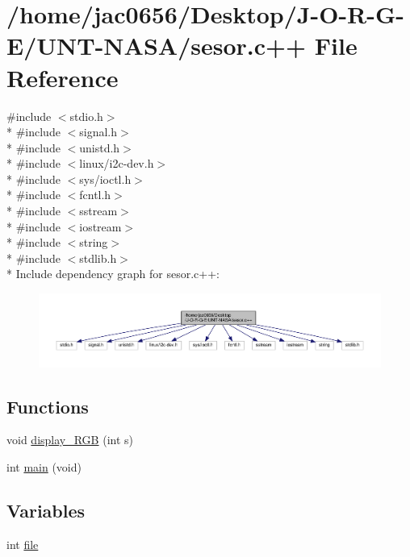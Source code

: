 \hypertarget{sesor_8c_09_09}{}\section{/home/jac0656/\+Desktop/\+J-\/\+O-\/\+R-\/\+G-\/\+E/\+U\+N\+T-\/\+N\+A\+S\+A/sesor.c++ File Reference}
\label{sesor_8c_09_09}
{\ttfamily \#include $<$stdio.\+h$>$}\\*
{\ttfamily \#include $<$signal.\+h$>$}\\*
{\ttfamily \#include $<$unistd.\+h$>$}\\*
{\ttfamily \#include $<$linux/i2c-\/dev.\+h$>$}\\*
{\ttfamily \#include $<$sys/ioctl.\+h$>$}\\*
{\ttfamily \#include $<$fcntl.\+h$>$}\\*
{\ttfamily \#include $<$sstream$>$}\\*
{\ttfamily \#include $<$iostream$>$}\\*
{\ttfamily \#include $<$string$>$}\\*
{\ttfamily \#include $<$stdlib.\+h$>$}\\*
Include dependency graph for sesor.\+c++\+:
\nopagebreak
\begin{figure}[H]
\begin{center}
\leavevmode
\includegraphics[width=350pt]{sesor_8c_09_09__incl}
\end{center}
\end{figure}
\subsection*{Functions}
\begin{DoxyCompactItemize}
\item 
void \hyperlink{sesor_8c_09_09_af6d9d492718e5b567f2de33317908a60}{display\+\_\+\+R\+GB} (int s)
\item 
int \hyperlink{sesor_8c_09_09_a840291bc02cba5474a4cb46a9b9566fe}{main} (void)
\end{DoxyCompactItemize}
\subsection*{Variables}
\begin{DoxyCompactItemize}
\item 
int \hyperlink{sesor_8c_09_09_a6fb021f1c9bd6c7fc72f1c0f24b81b38}{file}
\end{DoxyCompactItemize}


